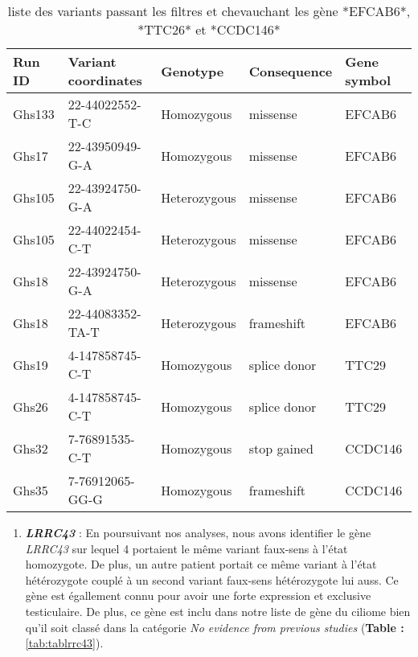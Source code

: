\documentclass[12pt,twoside]{reedthesis}
\providecommand{\tightlist}{%
  \setlength{\itemsep}{0pt}\setlength{\parskip}{0pt}}
\theoremstyle{definition}
\theoremstyle{definition}
\theoremstyle{remark}
\begin{document}
  \begin{longtable}[t]{lllll}
  \caption{\label{tab:tabefcab6ttc29ccdc146}liste des variants passant les filtres et chevauchant les gène *EFCAB6*, *TTC26* et *CCDC146*}\\
  \toprule
  Run ID & Variant coordinates & Genotype & Consequence & Gene symbol\\
  \midrule
  Ghs133 & 22-44022552-T-C & Homozygous & missense & EFCAB6\\
  Ghs17 & 22-43950949-G-A & Homozygous & missense & EFCAB6\\
  Ghs105 & 22-43924750-G-A & Heterozygous & missense & EFCAB6\\
  Ghs105 & 22-44022454-C-T & Heterozygous & missense & EFCAB6\\
  Ghs18 & 22-43924750-G-A & Heterozygous & missense & EFCAB6\\
  \addlinespace
  Ghs18 & 22-44083352-TA-T & Heterozygous & frameshift & EFCAB6\\
  Ghs19 & 4-147858745-C-T & Homozygous & splice donor & TTC29\\
  Ghs26 & 4-147858745-C-T & Homozygous & splice donor & TTC29\\
  Ghs32 & 7-76891535-C-T & Homozygous & stop gained & CCDC146\\
  Ghs35 & 7-76912065-GG-G & Homozygous & frameshift & CCDC146\\
  \bottomrule
  \end{longtable}
  
  \begin{enumerate}
  \def\labelenumi{\arabic{enumi}.}
  \setcounter{enumi}{2}
  \tightlist
  \item
    \textbf{\emph{LRRC43}} : En poursuivant nos analyses, nous avons
    identifier le gène \emph{LRRC43} sur lequel 4 portaient le même
    variant faux-sens à l'état homozygote. De plus, un autre patient
    portait ce même variant à l'état hétérozygote couplé à un second
    variant faux-sens hétérozygote lui auss. Ce gène est égallement connu
    pour avoir une forte expression et exclusive testiculaire. De plus, ce
    gène est inclu dans notre liste de gène du ciliome bien qu'il soit
    classé dans la catégorie \emph{No evidence from previous studies}
    (\textbf{Table : }\ref{tab:tablrrc43}).
  \end{enumerate}
  
\end{document}
